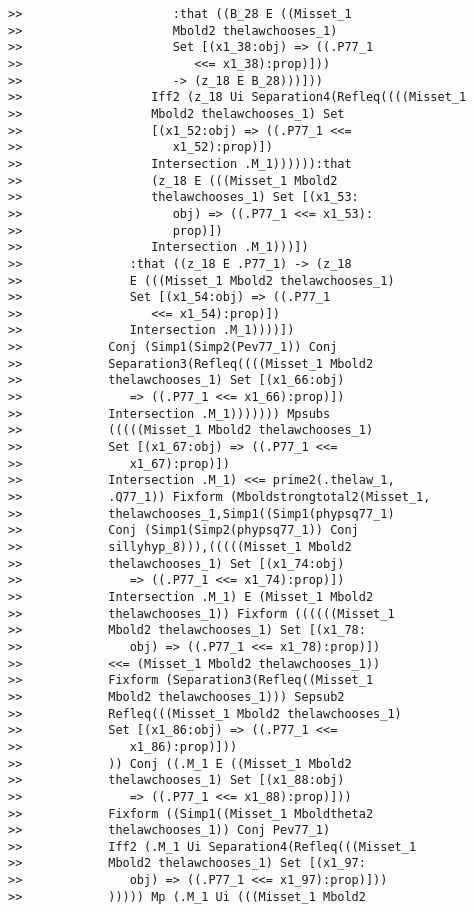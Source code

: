 \documentclass[12pt]{article}
\begin{document}
\begin{verbatim}
>>                     :that ((B_28 E ((Misset_1
>>                     Mbold2 thelawchooses_1)
>>                     Set [(x1_38:obj) => ((.P77_1
>>                        <<= x1_38):prop)]))
>>                     -> (z_18 E B_28)))]))
>>                  Iff2 (z_18 Ui Separation4(Refleq((((Misset_1
>>                  Mbold2 thelawchooses_1) Set
>>                  [(x1_52:obj) => ((.P77_1 <<=
>>                     x1_52):prop)])
>>                  Intersection .M_1)))))):that
>>                  (z_18 E (((Misset_1 Mbold2
>>                  thelawchooses_1) Set [(x1_53:
>>                     obj) => ((.P77_1 <<= x1_53):
>>                     prop)])
>>                  Intersection .M_1)))])
>>               :that ((z_18 E .P77_1) -> (z_18
>>               E (((Misset_1 Mbold2 thelawchooses_1)
>>               Set [(x1_54:obj) => ((.P77_1
>>                  <<= x1_54):prop)])
>>               Intersection .M_1))))])
>>            Conj (Simp1(Simp2(Pev77_1)) Conj
>>            Separation3(Refleq((((Misset_1 Mbold2
>>            thelawchooses_1) Set [(x1_66:obj)
>>               => ((.P77_1 <<= x1_66):prop)])
>>            Intersection .M_1))))))) Mpsubs
>>            (((((Misset_1 Mbold2 thelawchooses_1)
>>            Set [(x1_67:obj) => ((.P77_1 <<=
>>               x1_67):prop)])
>>            Intersection .M_1) <<= prime2(.thelaw_1,
>>            .Q77_1)) Fixform (Mboldstrongtotal2(Misset_1,
>>            thelawchooses_1,Simp1((Simp1(phypsq77_1)
>>            Conj (Simp1(Simp2(phypsq77_1)) Conj
>>            sillyhyp_8))),(((((Misset_1 Mbold2
>>            thelawchooses_1) Set [(x1_74:obj)
>>               => ((.P77_1 <<= x1_74):prop)])
>>            Intersection .M_1) E (Misset_1 Mbold2
>>            thelawchooses_1)) Fixform ((((((Misset_1
>>            Mbold2 thelawchooses_1) Set [(x1_78:
>>               obj) => ((.P77_1 <<= x1_78):prop)])
>>            <<= (Misset_1 Mbold2 thelawchooses_1))
>>            Fixform (Separation3(Refleq((Misset_1
>>            Mbold2 thelawchooses_1))) Sepsub2
>>            Refleq(((Misset_1 Mbold2 thelawchooses_1)
>>            Set [(x1_86:obj) => ((.P77_1 <<=
>>               x1_86):prop)]))
>>            )) Conj ((.M_1 E ((Misset_1 Mbold2
>>            thelawchooses_1) Set [(x1_88:obj)
>>               => ((.P77_1 <<= x1_88):prop)]))
>>            Fixform ((Simp1((Misset_1 Mboldtheta2
>>            thelawchooses_1)) Conj Pev77_1)
>>            Iff2 (.M_1 Ui Separation4(Refleq(((Misset_1
>>            Mbold2 thelawchooses_1) Set [(x1_97:
>>               obj) => ((.P77_1 <<= x1_97):prop)]))
>>            ))))) Mp (.M_1 Ui (((Misset_1 Mbold2

\end{verbatim}
\end{document}
